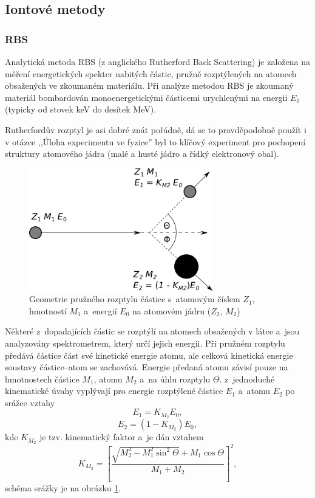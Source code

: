 \documentclass[12pt]{article}
\begin{document}
\subsection{Iontové metody}

\subsubsection{RBS}
Analytická metoda RBS (z anglického Rutherford Back Scattering) je založena na měření energetických spekter nabitých částic, pružně rozptýlených na atomech obsažených ve zkoumaném materiálu. 
Při analýze metodou RBS je zkoumaný materiál bombardován monoenergetickými částicemi urychlenými na energii $E_0$ (typicky od stovek keV do desítek MeV). 

Rutherfordův rozptyl je asi dobré znát pořádně, dá se to pravděpodobně použít i v otázce ,,Úloha experimentu ve fyzice'' byl to klíčový experiment pro pochopení struktury atomového jádra (malé a husté jádro a řídký elektronový obal). 

\begin{figure}[btp]
  \centering
  \includegraphics[width=80mm]{rutherford.pdf}
  \caption{Geometrie pružného rozptylu částice s~atomovým číslem $Z_1$, hmotností $M_1$ a~energií $E_0$ na atomovém jádru ($Z_2$, $M_2$)}
  \label{rutherford}
\end{figure}

Některé z~dopadajících částic se rozptýlí na atomech obsažených v látce a~jsou analyzovány spektrometrem, který určí jejich energii. Při pružném rozptylu předává částice část své kinetické energie atomu, ale celková kinetická energie soustavy částice--atom se zachovává. Energie předaná atomu závisí pouze na hmotnostech částice $M_1$, atomu $M_2$ a~na úhlu rozptylu $\Theta$. z~jednoduché kinematické úvahy vyplývají pro energie rozptýlené částice $E_1$ a~atomu $E_2$ po srážce vztahy
%
\begin{equation}
E_1 = K_{M_2} E_0 \mathrm{,}
\end{equation}
\begin{equation}
E_2 = (1 - K_{M_2}) E_0 \mathrm{,}
\end{equation}  
%
kde $K_{M_2}$ je tzv. kinematický faktor a~je dán vztahem
\begin{equation}
K_{M_2} = \left[ \frac{\sqrt{M_2^2 - M_1^2\sin^2\Theta} + M_1 \cos\Theta}{M_1 + M_2} \right]^2 \mathrm{,}
\end{equation}
schéma srážky je na obrázku \ref{rutherford}.
\end{document}
